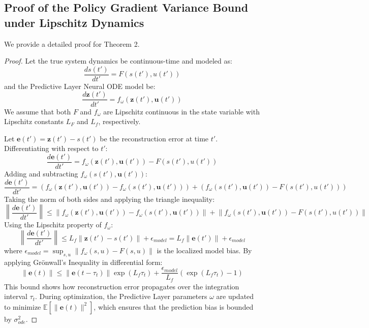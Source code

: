 \documentclass[manuscript, screen, review]{jair}
\begin{document}
\subsection{Proof of the Policy Gradient Variance Bound under Lipschitz Dynamics}\label{app:sub_variance}
We provide a detailed proof for Theorem 2.
\begin{proof}
Let the true system dynamics be continuous-time and modeled as:
\begin{equation*}
    \frac{ds(t')}{dt'} = F(s(t'), u(t'))
\end{equation*}
and the Predictive Layer Neural ODE model be:
\begin{equation*}
    \frac{d\mathbf{z}(t')}{dt'} = f_\omega(\mathbf{z}(t'), \mathbf{u}(t'))
\end{equation*}
We assume that both $F$ and $f_\omega$ are Lipschitz continuous in the state variable with Lipschitz constants $L_F$ and $L_f$, respectively.

Let $\mathbf{e}(t') = \mathbf{z}(t') - s(t')$ be the reconstruction error at time $t'$. Differentiating with respect to $t'$:
\begin{equation*}
    \frac{d\mathbf{e}(t')}{dt'} = f_\omega(\mathbf{z}(t'), \mathbf{u}(t')) - F(s(t'), u(t'))
\end{equation*}
Adding and subtracting $f_\omega(s(t'), \mathbf{u}(t'))$:
\begin{equation*}
    \frac{d\mathbf{e}(t')}{dt'} = \left( f_\omega(\mathbf{z}(t'), \mathbf{u}(t')) - f_\omega(s(t'), \mathbf{u}(t')) \right) + \left( f_\omega(s(t'), \mathbf{u}(t')) - F(s(t'), u(t')) \right)
\end{equation*}
Taking the norm of both sides and applying the triangle inequality:
\begin{equation*}
    \left\| \frac{d\mathbf{e}(t')}{dt'} \right\| \le \left\| f_\omega(\mathbf{z}(t'), \mathbf{u}(t')) - f_\omega(s(t'), \mathbf{u}(t')) \right\| + \left\| f_\omega(s(t'), \mathbf{u}(t')) - F(s(t'), u(t')) \right\|
\end{equation*}
Using the Lipschitz property of $f_\omega$:
\begin{equation*}
    \left\| \frac{d\mathbf{e}(t')}{dt'} \right\| \le L_f \| \mathbf{z}(t') - s(t') \| + \epsilon_{model} = L_f \| \mathbf{e}(t') \| + \epsilon_{model}
\end{equation*}
where $\epsilon_{model} = \sup_{s, u} \| f_\omega(s, u) - F(s, u) \|$ is the localized model bias. By applying Grönwall's Inequality in differential form:
\begin{equation}
    \| \mathbf{e}(t) \| \le \| \mathbf{e}(t-\tau_t) \| \exp(L_f \tau_t) + \frac{\epsilon_{model}}{L_f} \left( \exp(L_f \tau_t) - 1 \right)
\end{equation}
This bound shows how reconstruction error propagates over the integration interval $\tau_t$. During optimization, the Predictive Layer parameters $\omega$ are updated to minimize $\mathbb{E}[\|\mathbf{e}(t)\|^2]$, which ensures that the prediction bias is bounded by $\sigma_{ode}^2$.


\end{proof}
\end{document}
